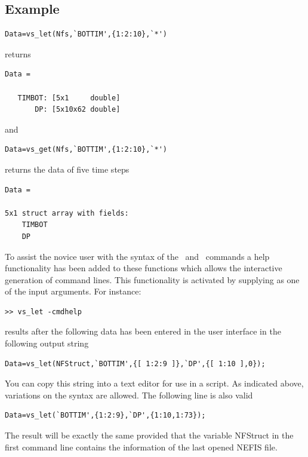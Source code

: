 \subsection*{Example}
\begin{Verbatim}
Data=vs_let(Nfs,`BOTTIM',{1:2:10},`*')
\end{Verbatim}

returns

\begin{Verbatim}
Data =

   TIMBOT: [5x1     double]
       DP: [5x10x62 double]
\end{Verbatim}

and

\begin{Verbatim}
Data=vs_get(Nfs,`BOTTIM',{1:2:10},`*')
\end{Verbatim}

returns the data of five time steps

\begin{Verbatim}
Data =

5x1 struct array with fields:
    TIMBOT
    DP
\end{Verbatim}

To assist the novice user with the syntax of the \vslet~and \vsget~commands a help functionality has been added to these functions which allows the interactive generation of command lines.
This functionality is activated by supplying  as one of the input arguments.
For instance:

\begin{Verbatim}
>> vs_let -cmdhelp
\end{Verbatim}

results after the following data has been entered in the user interface in the following output string

\begin{Verbatim}
Data=vs_let(NFStruct,`BOTTIM',{[ 1:2:9 ]},`DP',{[ 1:10 ],0});
\end{Verbatim}

You can copy this string into a text editor for use in a script.
As indicated above, variations on the syntax are allowed.
The following line is also valid

\begin{Verbatim}
Data=vs_let(`BOTTIM',{1:2:9},`DP',{1:10,1:73});
\end{Verbatim}

The result will be exactly the same provided that the variable NFStruct in the first command line contains the information of the last opened NEFIS file.

